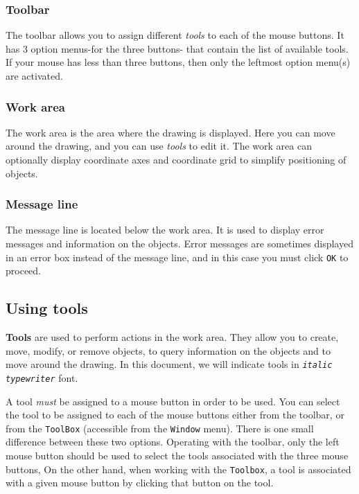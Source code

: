 \documentclass[a4paper,10pt]{report}
\begin{document}
\subsubsection{Toolbar}

The toolbar allows you to assign different {\it tools} to each of the mouse
buttons. It has 3 option menus-for the three buttons- that contain the
list of available tools. If your mouse has less than three buttons,
then only the leftmost option menu(s) are activated.

\subsubsection{Work area}

The work area is the area where the drawing is displayed. Here you can
move around the drawing, and you can use {\it tools} to edit it. The
work area can optionally display coordinate axes and coordinate grid
to simplify positioning of objects.

\subsubsection{Message line}

The message line is located below the work area. It is used to display
error messages and information on the objects. Error messages are
sometimes displayed in an error box instead of the message line, and
in this case you must click {\tt OK} to proceed.

\subsection{Using tools}

{\bf Tools} are used to perform actions in the work area. They allow
you to create, move, modify, or remove objects, to query information
on the objects and to move around the drawing.
In this document, we will indicate tools in {\it {\tt italic
typewriter}} font.

A tool {\it must} be assigned to a mouse button in order to be used. You can
select the tool to be assigned to each of the mouse buttons either
from the toolbar, or from the {\tt ToolBox} (accessible from the {\tt Window} menu). There is one
small difference between these two options. Operating with the
toolbar, only the left mouse button should be used to select the tools associated
with the three mouse buttons,
On the other hand, when working with the {\tt Toolbox},
a tool is associated
with a given mouse button by clicking that button on the tool.
\end{document}
